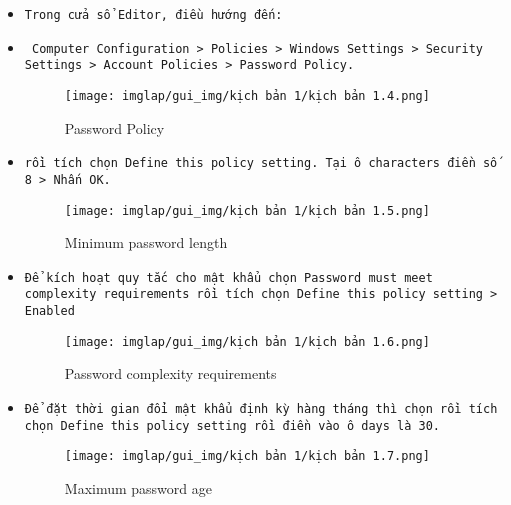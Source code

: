 \documentclass[13pt]{article}
\begin{document}
\begin{enumerate}
\begin{itemize}
\begin{itemize}
        \item \texttt{Trong cửa sổ }\textbf{}\texttt{Editor, điều hướng đến:}
        \item \texttt{
Computer Configuration > Policies > Windows Settings > Security Settings > Account Policies > Password Policy.}
\begin{figure}[H]
    \centering
    \texttt{[image: imglap/gui\_img/kịch bản 1/kịch bản 1.4.png]}
    \caption{Password Policy}
    \label{fig:enter-label}
\end{figure}

        \item \textbf{}\texttt{rồi tích chọn Define this policy setting. Tại ô characters điền số 8 > Nhấn OK.}
\begin{figure}[H]
    \centering
    \texttt{[image: imglap/gui\_img/kịch bản 1/kịch bản 1.5.png]}
    \caption{Minimum password length}
    \label{fig:enter-label}
\end{figure}

\item \texttt{Để kích hoạt quy tắc cho mật khẩu chọn Password must meet complexity requirements rồi tích chọn Define this policy setting > Enabled}
\begin{figure}[H]
    \centering
    \texttt{[image: imglap/gui\_img/kịch bản 1/kịch bản 1.6.png]}
    \caption{Password complexity requirements}
    \label{fig:enter-label}
\end{figure}

\item \texttt{Để đặt thời gian đổi mật khẩu định kỳ hàng tháng thì chọn }\textbf{}\texttt{rồi tích chọn Define this policy setting rồi điền vào ô days là 30.}
\begin{figure}[H]
    \centering
    \texttt{[image: imglap/gui\_img/kịch bản 1/kịch bản 1.7.png]}
    \caption{Maximum password age}
    \label{fig:enter-label}
\end{figure}


\end{itemize}
\end{itemize}
\end{enumerate}
\end{document}
